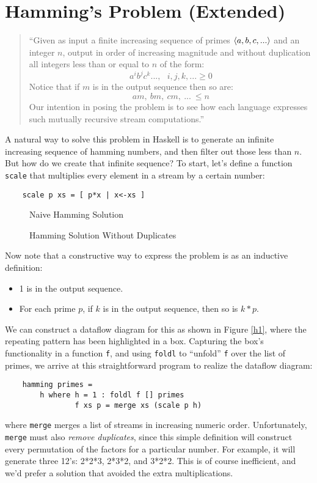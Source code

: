 \section{Hamming's Problem (Extended)}

\begin{quotation}
``Given as input a finite increasing sequence of primes
$\langle a,b,c,...\rangle$ and an integer $n$, output in order of increasing
magnitude and without duplication all integers less than or equal to
$n$ of the form:
\[ a^i b^j c^k...,\ \ \ i,j,k,...\geq 0 \]
Notice that if $m$ is in the output sequence then so are:
\[ am,\ bm,\ cm,\ ...\ \leq n \]
Our intention in posing the problem is to see how each language
expresses such mutually recursive stream computations.''
\end{quotation}

A natural way to solve this problem in Haskell is to generate an
infinite increasing sequence of hamming numbers, and then filter out
those less than $n$.  But how do we create that infinite sequence?  To
start, let's define a function {\tt scale} that multiplies every
element in a stream by a certain number:
\begin{verbatim}
    scale p xs = [ p*x | x<-xs ]
\end{verbatim}

\begin{figure}
\vspace{2.5in}
\caption{Naive Hamming Solution}
\label{h1}
\vspace{3.5in}
\caption{Hamming Solution Without Duplicates}
\label{h2}
\end{figure}

Now note that a constructive way to express the problem is as an
inductive definition:
\begin{itemize}
\item 1 is in the output sequence.
\item For each prime $p$, if $k$ is in the output sequence, then so is
      $k*p$.
\end{itemize}
We can construct a dataflow diagram for this as shown in Figure
\ref{h1}, where the repeating pattern has been highlighted in a
box.  Capturing the box's functionality in a function {\tt f}, and using
{\tt foldl} to ``unfold'' {\tt f} over the list of primes, we arrive at
this straightforward program to realize the dataflow diagram:
\begin{verbatim}
    hamming primes = 
        h where h = 1 : foldl f [] primes
                f xs p = merge xs (scale p h)
\end{verbatim}
where {\tt merge} merges a list of streams in increasing numeric
order.  Unfortunately, {\tt merge} must also {\em remove duplicates},
since this simple definition will construct every permutation of the
factors for a particular number.  For example, it will generate three
12's: 2*2*3, 2*3*2, and 3*2*2.  This is of course inefficient, and
we'd prefer a solution that avoided the extra multiplications.  

